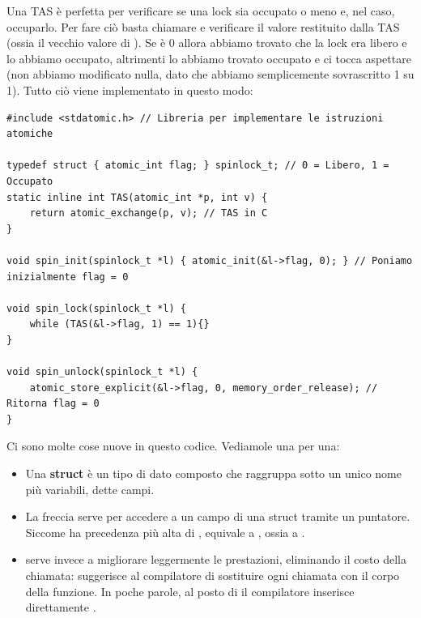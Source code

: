 \documentclass[11pt, a4paper, titlepage, oneside]{scrbook}
\begin{document}
Una TAS è perfetta per verificare se una lock sia occupato o meno e, nel caso, occuparlo. Per fare ciò basta chiamare  e verificare il valore restituito dalla TAS (ossia il vecchio valore di ). Se è 0 allora abbiamo trovato che la lock era libero e lo abbiamo occupato, altrimenti lo abbiamo trovato occupato e ci tocca aspettare (non abbiamo modificato nulla, dato che abbiamo semplicemente sovrascritto 1 su 1). Tutto ciò viene implementato in questo modo:

\begin{lstlisting}[style=C]
#include <stdatomic.h> // Libreria per implementare le istruzioni atomiche

typedef struct { atomic_int flag; } spinlock_t; // 0 = Libero, 1 = Occupato
static inline int TAS(atomic_int *p, int v) { 
    return atomic_exchange(p, v); // TAS in C
}

void spin_init(spinlock_t *l) { atomic_init(&l->flag, 0); } // Poniamo inizialmente flag = 0

void spin_lock(spinlock_t *l) {
    while (TAS(&l->flag, 1) == 1){}
}

void spin_unlock(spinlock_t *l) {
    atomic_store_explicit(&l->flag, 0, memory_order_release); // Ritorna flag = 0
}
\end{lstlisting}

\NB Ci sono molte cose nuove in questo codice. Vediamole una per una:
\begin{itemize}
    \item Una \textbf{struct} è un tipo di dato composto che raggruppa sotto un unico nome più variabili, dette campi.
    \item La freccia \code{->} serve per accedere a un campo di una struct tramite un puntatore. Siccome \code{->} ha precedenza più alta di \code{\&},  equivale a , ossia a .
    \item {} serve invece a migliorare leggermente le prestazioni, eliminando il costo della chiamata: suggerisce al compilatore di sostituire ogni chiamata con il corpo della funzione. In poche parole, al posto di  il compilatore inserisce direttamente .
\end{itemize}
\end{document}
